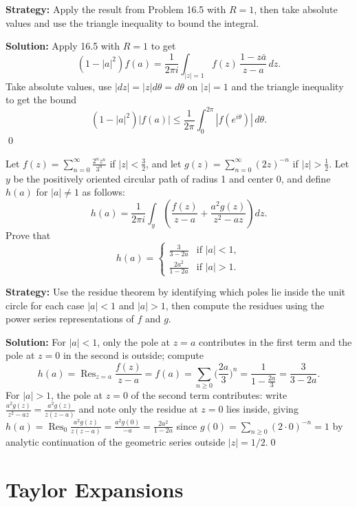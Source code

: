 \noindent\textbf{Strategy:} Apply the result from Problem 16.5 with \( R = 1 \), then take absolute values and use the triangle inequality to bound the integral.

\bigskip\noindent\textbf{Solution:}
Apply 16.5 with $R=1$ to get
\[(1-|a|^2)f(a)=\frac{1}{2\pi i}\int_{|z|=1} f(z)\,\frac{1-z\bar a}{z-a}\,dz.\]
Take absolute values, use $|dz|=|z|d\theta=d\theta$ on $|z|=1$ and the triangle inequality to get the bound
\[(1-|a|^2)|f(a)|\le \frac{1}{2\pi}\int_0^{2\pi}|f(e^{i\theta})|\,d\theta.\]\qed


\begin{problembox}
Let \( f(z) = \sum_{n=0}^{\infty} \frac{2^n z^n}{3^n} \) if \( |z| < \frac{3}{2} \), and let \( g(z) = \sum_{n=0}^{\infty} (2z)^{-n} \) if \( |z| > \frac{1}{2} \). Let \( y \) be the positively oriented circular path of radius 1 and center 0, and define \( h(a) \) for \( |a| \neq 1 \) as follows:
\[h(a) = \frac{1}{2\pi i} \int_y \left( \frac{f(z)}{z - a} + \frac{a^2 g(z)}{z^2 - az} \right) dz.\]
Prove that
\[h(a) = \begin{cases} 
\frac{3}{3 - 2a} & \text{if } |a| < 1, \\ 
\frac{2a^2}{1 - 2a} & \text{if } |a| > 1.
\end{cases}\]
\end{problembox}

\noindent\textbf{Strategy:} Use the residue theorem by identifying which poles lie inside the unit circle for each case \( |a| < 1 \) and \( |a| > 1 \), then compute the residues using the power series representations of \( f \) and \( g \).

\bigskip\noindent\textbf{Solution:}
For $|a|<1$, only the pole at $z=a$ contributes in the first term and the pole at $z=0$ in the second is outside; compute
\[h(a)=\operatorname{Res}_{z=a}\frac{f(z)}{z-a}=f(a)=\sum_{n\ge0}\Big(\frac{2a}{3}\Big)^n=\frac{1}{1-\frac{2a}{3}}=\frac{3}{3-2a}.
\]
For $|a|>1$, the pole at $z=0$ of the second term contributes: write $\frac{a^2g(z)}{z^2-az}=\frac{a^2g(z)}{z(z-a)}$ and note only the residue at $z=0$ lies inside, giving $h(a)=\operatorname{Res}_{0}\frac{a^2g(z)}{z(z-a)}=\frac{a^2g(0)}{-a}=\frac{2a^2}{1-2a}$ since $g(0)=\sum_{n\ge0} (2\cdot0)^{-n}=1$ by analytic continuation of the geometric series outside $|z|=1/2$.\qed
\section{Taylor Expansions}

